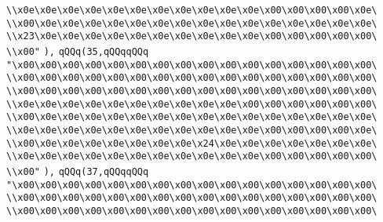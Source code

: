 \verb|\\x0e\x0e\x0e\x0e\x0e\x0e\x0e\x0e\x0e\x0e\x0e\x00\x00\x00\x00\x0e\|\newline
\verb|\\x00\x0e\x0e\x0e\x0e\x0e\x0e\x0e\x0e\x0e\x0e\x0e\x0e\x0e\x0e\x0e\|\newline
\verb|\\x23\x0e\x0e\x0e\x0e\x0e\x0e\x0e\x0e\x0e\x0e\x00\x00\x00\x00\x00\|\newline
\verb|\\x00"|\newline
\verb|),|\newline
\verb|qQQq(35,qQQqqQQq|\newline
\verb|"\x00\x00\x00\x00\x00\x00\x00\x00\x00\x00\x00\x00\x00\x00\x00\x00\|\newline
\verb|\\x00\x00\x00\x00\x00\x00\x00\x00\x00\x00\x00\x00\x00\x00\x00\x00\|\newline
\verb|\\x00\x00\x00\x00\x00\x00\x00\x00\x00\x00\x00\x00\x00\x00\x00\x00\|\newline
\verb|\\x0e\x0e\x0e\x0e\x0e\x0e\x0e\x0e\x0e\x0e\x00\x00\x00\x00\x00\x00\|\newline
\verb|\\x00\x0e\x0e\x0e\x0e\x0e\x0e\x0e\x0e\x0e\x0e\x0e\x0e\x0e\x0e\x0e\|\newline
\verb|\\x0e\x0e\x0e\x0e\x0e\x0e\x0e\x0e\x0e\x0e\x0e\x00\x00\x00\x00\x0e\|\newline
\verb|\\x00\x0e\x0e\x0e\x0e\x0e\x0e\x0e\x24\x0e\x0e\x0e\x0e\x0e\x0e\x0e\|\newline
\verb|\\x0e\x0e\x0e\x0e\x0e\x0e\x0e\x0e\x0e\x0e\x0e\x00\x00\x00\x00\x00\|\newline
\verb|\\x00"|\newline
\verb|),|\newline
\verb|qQQq(37,qQQqqQQq|\newline
\verb|"\x00\x00\x00\x00\x00\x00\x00\x00\x00\x00\x00\x00\x00\x00\x00\x00\|\newline
\verb|\\x00\x00\x00\x00\x00\x00\x00\x00\x00\x00\x00\x00\x00\x00\x00\x00\|\newline
\verb|\\x00\x00\x00\x00\x00\x00\x00\x00\x00\x00\x00\x00\x00\x00\x00\x00\|\newline
